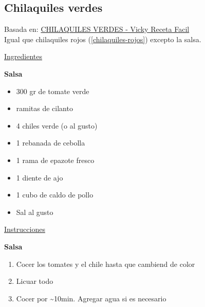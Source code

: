 \subsection{Chilaquiles verdes}\label{chilaquiles-verdes}

Basada en: \href{https://www.youtube.com/watch?v=CcuHrqMZOFU}{CHILAQUILES VERDES - Vicky Receta Facil} \\

Igual que chilaquiles rojos (\ref{chilaquiles-rojos})  excepto la salsa.

\underline{Ingredientes}

\textbf{Salsa}
\begin{itemize}
\item 300 gr de tomate verde
\item {} ramitas de cilanto
\item 4 chiles verde (o al gusto)
\item 1 rebanada de cebolla
\item 1 rama de epazote fresco
\item 1 diente de ajo
\item 1 cubo de caldo de pollo
\item Sal al gusto
\end{itemize}


\underline{Instrucciones}

\textbf{Salsa}
\begin{enumerate}
\item Cocer los tomates y el chile hasta que cambiend de color
\item Licuar todo
\item Cocer por \sim 10min. Agregar agua si es necesario
\end{enumerate}

